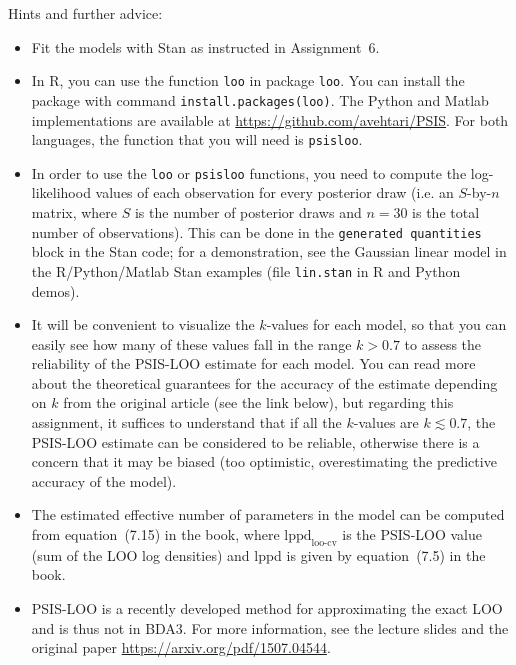 \documentclass[a4paper,11pt]{article}
\begin{document}
Hints and further advice:
\begin{itemize}
\item Fit the models with Stan as instructed in Assignment~6.
\item In R, you can use the function {\tt loo} in package {\tt loo}. You can install the package with command {\tt install.packages(loo)}. The Python and Matlab implementations are available at \url{https://github.com/avehtari/PSIS}. For both languages, the function that you will need is {\tt psisloo}.
\item In order to use the {\tt loo} or {\tt psisloo} functions, you need to compute the log-likelihood values of each observation for every posterior draw (i.e. an $S$-by-$n$ matrix, where $S$ is the number of posterior draws and $n=30$ is the total number of observations). This can be done in the {\tt generated quantities} block in the Stan code; for a demonstration, see the Gaussian linear model in the R/Python/Matlab Stan examples (file {\tt lin.stan} in R and Python demos).
\item It will be convenient to visualize the $k$-values for each model, so that you can easily see how many of these values fall in the range $k > 0.7$ to assess the reliability of the PSIS-LOO estimate for each model. You can read more about the theoretical guarantees for the accuracy of the estimate depending on $k$ from the original article (see the link below), but regarding this assignment, it suffices to understand that if all the $k$-values are $k \lesssim 0.7$, the PSIS-LOO estimate can be considered to be reliable, otherwise there is a concern that it may be biased (too optimistic, overestimating the predictive accuracy of the model).
\item The estimated effective number of parameters in the model can be computed from equation~(7.15) in the book, where $\text{lppd}_\text{loo-cv}$ is the PSIS-LOO value (sum of the LOO log densities) and lppd is given by equation~(7.5) in the book.
\item PSIS-LOO is a recently developed method for approximating the exact LOO and is thus not in BDA3. For more information, see the lecture slides and the original paper \url{https://arxiv.org/pdf/1507.04544}.
\end{itemize}
\end{document}
